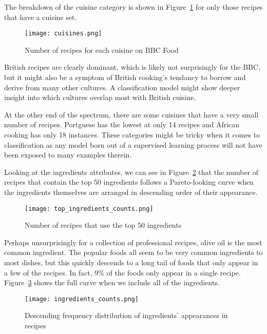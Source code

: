 \documentclass[11pt,a4paper]{article}
\begin{document}
The breakdown of the cuisine category is shown in Figure~\ref{cuisines-barchart}
for only those recipes that have a cuisine set.

\begin{figure}[p]
  \texttt{[image: cuisines.png]}
  \caption{Number of recipes for each cuisine on BBC Food\label{cuisines-barchart}}
\end{figure}

British recipes are clearly dominant, which is likely not surprisingly for the
BBC, but it might also be a symptom of British cooking's tendancy to borrow and
derive from
many other cultures. A classification model might show deeper insight into which
cultures overlap most with British cuisine.

At the other end of the spectrum, there are some cuisines that have a very small
number of recipes. Portguese has the lowest at only 14 recipes and African
cooking has only 18 instances. These categories might be tricky when it comes to
classification as any model born out of a supervised learning process will not
have been exposed to many examples therein.

Looking at the ingredients attributes, we can see in Figure~\ref{top-ingredients}
that the number of recipes that contain the top 50 ingredients follows a
Pareto-looking curve when the ingredients themselves are arranged in descending
order of their appearance.

\begin{figure}[p]
  \texttt{[image: top\_ingredients\_counts.png]}
  \caption{Number of recipes that use the top 50 ingredients\label{top-ingredients}}
\end{figure}

Perhaps unsurprisingly for a collection of professional recipes, olive oil is the most
common ingredient. The popular foods all seem to be very common ingredients to most
dishes, but this quickly descends to a long tail of foods that only appear in a few
of the recipes. In fact, 9\% of the foods only appear in a single recipe.
Figure~\ref{ingredients-counts} shows the full curve when we include all of the
ingredients.

\begin{figure}[p]
  \texttt{[image: ingredients\_counts.png]}
  \caption{Descending frequency distribution of ingredients' appearances in recipes\label{ingredients-counts}}
\end{figure}
\end{document}
